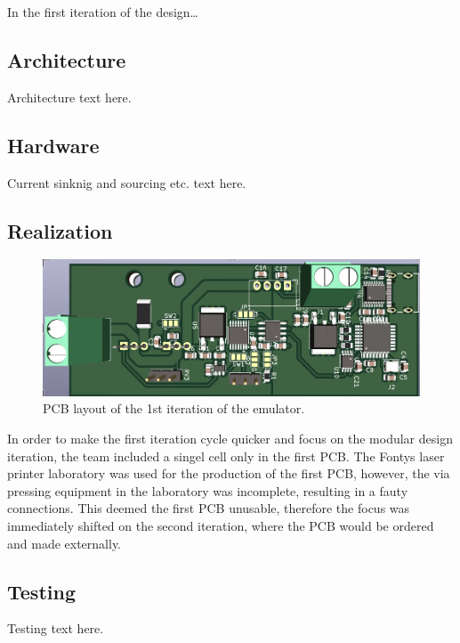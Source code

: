 
\IEEEPARstart
{I}{n} the first iteration of the design\dots

\subsection{Architecture}
Architecture text here.
\subsection{Hardware}
Current sinknig and sourcing etc. text here.
\subsection{Realization}
    \begin{figure}[h]
        \centering
        \includegraphics[scale=0.45]{pcb_1st_iteration.png}
        \caption{PCB layout of the 1st iteration of the emulator.}
    \end{figure}


In order to make the first iteration cycle quicker and focus on the modular design 
iteration, the team included a singel cell only in the first PCB. The Fontys laser
printer laboratory was used for the production of the first PCB, however, the via pressing
equipment in the laboratory was incomplete, resulting in a fauty connections. This 
deemed the first PCB unusable, therefore the focus was immediately shifted on the 
second iteration, where the PCB would be ordered and made externally.

\subsection{Testing}
Testing text here.